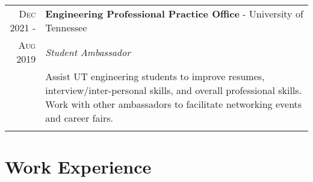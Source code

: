 \documentclass[a4paper,12pt]{article}
\begin{document}
\begin{tabularx}{\textwidth}{r|X}

   \textsc{Dec 2021 \--} & \textbf{Engineering Professional Practice Office} \-- University of Tennessee\\
   \textsc{Aug 2019} & \emph{Student Ambassador}\\
   & \small{Assist UT engineering students to improve resumes, interview/inter-personal skills, and overall professional skills.
            Work with other ambassadors to facilitate networking events and career fairs.
   }\\

   \multicolumn{2}{c}{} \\

\end{tabularx}

\section{Work Experience}
\end{document}
